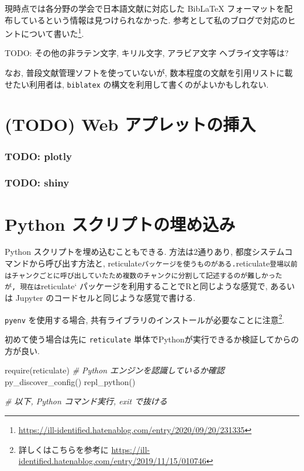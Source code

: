 \documentclass[
  xelatex,ja=standard,jafont=noto]{bxjsbook}
\newenvironment{Shaded}{\begin{snugshade}}{\end{snugshade}}
\newcommand{\CommentTok}[1]{\textcolor[rgb]{0.56,0.35,0.01}{\textit{#1}}}
\newcommand{\FunctionTok}[1]{\textcolor[rgb]{0.00,0.00,0.00}{#1}}
\newcommand{\NormalTok}[1]{#1}
\theoremstyle{definition}
\theoremstyle{definition}
\theoremstyle{definition}
\theoremstyle{definition}
\theoremstyle{remark}
\begin{document}
現時点では各分野の学会で日本語文献に対応した BibLaTeX
フォーマットを配布しているという情報は見つけられなかった.
参考として私のブログで対応のヒントについて書いた\footnote{\url{https://ill-identified.hatenablog.com/entry/2020/09/20/231335}}.

TODO: その他の非ラテン文字, キリル文字, アラビア文字 ヘブライ文字等は?

なお, 普段文献管理ソフトを使っていないが,
数本程度の文献を引用リストに載せたい利用者は, \texttt{biblatex}
の構文を利用して書くのがよいかもしれない.

\hypertarget{webapp}{%
\chapter{(TODO) Web アプレットの挿入}\label{webapp}}

\hypertarget{todo-plotly}{%
\subsection{TODO: plotly}\label{todo-plotly}}

\hypertarget{todo-shiny}{%
\subsection{TODO: shiny}\label{todo-shiny}}

\hypertarget{python}{%
\chapter{Python スクリプトの埋め込み}\label{python}}

Python スクリプトを埋め込むこともできる. 方法は2通りあり,
都度システムコマンドから呼び出す方法と,
reticulate\texttt{パッケージを使うものがある.}reticulate\texttt{登場以前はチャンクごとに呼び出していたため複数のチャンクに分割して記述するのが難しかったが,\ 現在は}reticulate`
パッケージを利用することでRと同じような感覚で, あるいは Jupyter
のコードセルと同じような感覚で書ける.

\texttt{pyenv} を使用する場合,
共有ライブラリのインストールが必要なことに注意\footnote{詳しくはこちらを参考に
  \url{https://ill-identified.hatenablog.com/entry/2019/11/15/010746}}.

初めて使う場合は先に \texttt{reticulate}
単体でPythonが実行できるか検証してからの方が良い.

\begin{Shaded}
\begin{Highlighting}[numbers=left,,]
\FunctionTok{require}\NormalTok{(reticulate)}
\CommentTok{\# Python エンジンを認識しているか確認}
\FunctionTok{py\_discover\_config}\NormalTok{()}
\FunctionTok{repl\_python}\NormalTok{()}

\CommentTok{\# 以下, Python コマンド実行, \textasciigrave{}exit\textasciigrave{} で抜ける}
\end{Highlighting}
\end{Shaded}
\end{document}
